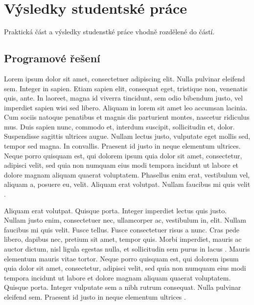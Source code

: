 \chapter{Výsledky studentské práce}

Praktická část a výsledky studenstké práce vhodně rozdělené do částí.

\section{Programové řešení}
Lorem ipsum dolor sit amet, consectetuer adipiscing elit. Nulla pulvinar eleifend sem. Integer in sapien. Etiam sapien elit, consequat eget, tristique non, venenatis quis, ante. In laoreet, magna id viverra tincidunt, sem odio bibendum justo, vel imperdiet sapien wisi sed libero. Aliquam in lorem sit amet leo accumsan lacinia. Cum sociis natoque penatibus et magnis dis parturient montes, nascetur ridiculus mus. Duis sapien nunc, commodo et, interdum suscipit, sollicitudin et, dolor. Suspendisse sagittis ultrices augue. Nullam lectus justo, vulputate eget mollis sed, tempor sed magna. In convallis. Praesent id justo in neque elementum ultrices. Neque porro quisquam est, qui dolorem ipsum quia dolor sit amet, consectetur, adipisci velit, sed quia non numquam eius modi tempora incidunt ut labore et dolore magnam aliquam quaerat voluptatem. Phasellus enim erat, vestibulum vel, aliquam a, posuere eu, velit. Aliquam erat volutpat. Nullam faucibus mi quis velit \cite{sr02/2009}.

Aliquam erat volutpat. Quisque porta. Integer imperdiet lectus quis justo. Nullam justo enim, consectetuer nec, ullamcorper ac, vestibulum in, elit. Nullam faucibus mi quis velit. Fusce tellus. Fusce consectetuer risus a nunc. Cras pede libero, dapibus nec, pretium sit amet, tempor quis. Morbi imperdiet, mauris ac auctor dictum, nisl ligula egestas nulla, et sollicitudin sem purus in lacus
\cite{CSN_ISO_690-2011,CSN_ISO_7144-1997,CSN_ISO_31-11}.
Mauris elementum mauris vitae tortor. Neque porro quisquam est, qui dolorem ipsum quia dolor sit amet, consectetur, adipisci velit, sed quia non numquam eius modi tempora incidunt ut labore et dolore magnam aliquam quaerat voluptatem. Quisque porta. Integer vulputate sem a nibh rutrum consequat. Nulla pulvinar eleifend sem. Praesent id justo in neque elementum ultrices \cite{BiernatovaSkupa2011:CSNISO690komentar}.

